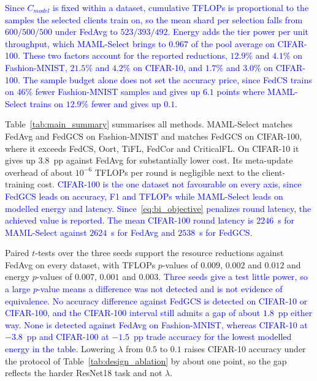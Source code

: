 \documentclass[journal]{IEEEtran}
\theoremstyle{remark}
\newcommand{\revision}[1]{#1}
\newcommand{\revtwo}[1]{\textcolor{blue}{#1}}
\begin{document}
\revtwo{Since $C_{model}$ is fixed within a dataset, cumulative TFLOPs is proportional to the samples the selected clients train on, so the mean shard per selection falls from $600/500/500$ under FedAvg to $523/393/492$. Energy adds the tier power per unit throughput, which MAML-Select brings to $0.967$ of the pool average on CIFAR-100. These two factors account for the reported reductions, $12.9\%$ and $4.1\%$ on Fashion-MNIST, $21.5\%$ and $4.2\%$ on CIFAR-10, and $1.7\%$ and $3.0\%$ on CIFAR-100. The sample budget alone does not set the accuracy price, since FedCS trains on $46\%$ fewer Fashion-MNIST samples and gives up $6.1$ points where MAML-Select trains on $12.9\%$ fewer and gives up $0.1$.}

\revision{Table~\ref{tab:main_summary} summarises all methods. MAML-Select matches FedAvg and FedGCS on Fashion-MNIST and matches FedGCS on CIFAR-100, where it exceeds FedCS, Oort, TiFL, FedCor and CriticalFL. On CIFAR-10 it gives up $3.8$~pp against FedAvg for substantially lower cost. Its meta-update overhead of about $10^{-6}$ TFLOPs per round is negligible next to the client-training cost.} \revtwo{CIFAR-100 is the one dataset not favourable on every axis, since FedGCS leads on accuracy, F1 and TFLOPs while MAML-Select leads on modelled energy and latency. Since~\eqref{eq:bi_objective} penalizes round latency, the achieved value is reported. The mean CIFAR-100 round latency is $2246$~s for MAML-Select against $2624$~s for FedAvg and $2538$~s for FedGCS.}

\revision{Paired $t$-tests over the three seeds support the resource reductions against FedAvg on every dataset, with TFLOPs $p$-values of $0.009$, $0.002$ and $0.012$ and energy $p$-values of $0.007$, $0.001$ and $0.003$.} \revtwo{Three seeds give a test little power, so a large $p$-value means a difference was not detected and is not evidence of equivalence. No accuracy difference against FedGCS is detected on CIFAR-10 or CIFAR-100, and the CIFAR-100 interval still admits a gap of about $1.8$~pp either way. None is detected against FedAvg on Fashion-MNIST, whereas CIFAR-10 at $-3.8$~pp and CIFAR-100 at $-1.5$~pp trade accuracy for the lowest modelled energy in the table.} \revision{Lowering $\lambda$ from $0.5$ to $0.1$ raises CIFAR-10 accuracy under the protocol of Table~\ref{tab:design_ablation} by about one point, so the gap reflects the harder ResNet18 task and not $\lambda$.}
\end{document}
